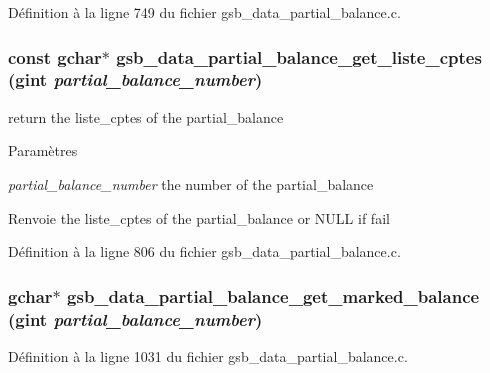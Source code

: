 Définition à la ligne 749 du fichier gsb\_\-data\_\-partial\_\-balance.c.

\subsubsection[{gsb\_\-data\_\-partial\_\-balance\_\-get\_\-liste\_\-cptes}]{\setlength{\rightskip}{0pt plus 5cm}const gchar$\ast$ gsb\_\-data\_\-partial\_\-balance\_\-get\_\-liste\_\-cptes (gint {\em partial\_\-balance\_\-number})}\label{gsb__data__partial__balance_8h_a60c22c649a2f4ff7460ece9208c88bc5}
return the liste\_\-cptes of the partial\_\-balance


\begin{DoxyParams}{Paramètres}
\item[{\em partial\_\-balance\_\-number}]the number of the partial\_\-balance\end{DoxyParams}
\begin{DoxyReturn}{Renvoie}
the liste\_\-cptes of the partial\_\-balance or NULL if fail 
\end{DoxyReturn}


Définition à la ligne 806 du fichier gsb\_\-data\_\-partial\_\-balance.c.

\subsubsection[{gsb\_\-data\_\-partial\_\-balance\_\-get\_\-marked\_\-balance}]{\setlength{\rightskip}{0pt plus 5cm}gchar$\ast$ gsb\_\-data\_\-partial\_\-balance\_\-get\_\-marked\_\-balance (gint {\em partial\_\-balance\_\-number})}\label{gsb__data__partial__balance_8h_afdd82919a412742b289e9ce8c8593138}


Définition à la ligne 1031 du fichier gsb\_\-data\_\-partial\_\-balance.c.

